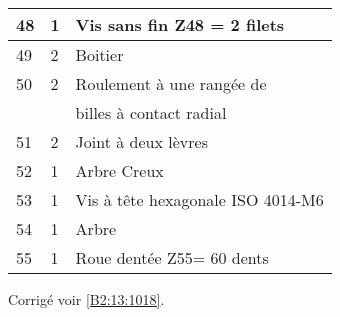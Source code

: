 \begin{center}
\begin{tabular}{|l|l|l|}
48&
1&
Vis sans fin Z48 = 2 filets \\ \hline %
49&
2&
Boitier\\ \hline %
50&
2&
Roulement à une rangée de \\ 
&& billes à contact radial\\  \hline %
51&
2&
Joint à deux lèvres \\ \hline %
52&
1&
Arbre Creux\\ \hline %
53&
1&
Vis à tête hexagonale ISO 4014-M6 \\ \hline %
54 & 
1 &
Arbre \\ \hline %
55 &
1&
Roue dentée Z55= 60 dents  \\ \hline %
\end{tabular}
\end{center}


\ifprof
\else
\fi

\ifprof
\else
\fi

\ifprof
\else
\fi


\ifprof
\else
\fi

\ifprof
\else

\footnotesize
\normalsize


\begin{flushright}
\footnotesize{Corrigé  voir \ref{B2:13:1018}.}
\end{flushright}%
\fi